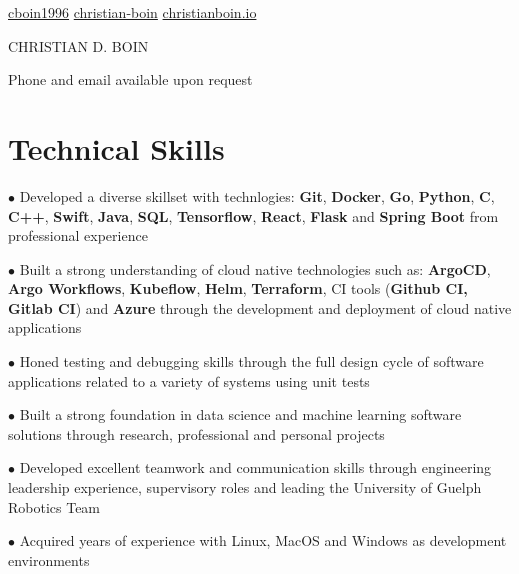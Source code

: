 \documentclass[a4paper,11pt]{article}
\newcommand{\name}{CHRISTIAN D. BOIN} %
\newcommand{\github}{cboin1996} %
\newcommand{\linkedin}{christian-boin-6b705a135} %
\begin{document}
\selectfont


\newcommand{\iconspace}{0.4mm}
\newcommand{\headingsep}{1cm}
\begin{center}
    \small{\href{https://github.com/\github}{\faGithub \hspace{\iconspace} \github} \hspace{\headingsep}
           \href{https://www.linkedin.com/in/\linkedin/}{\faLinkedinSquare \hspace{\iconspace} christian-boin} \hspace{\headingsep}
           \href{http://www.christianboin.io}{\faFileCodeO \hspace{\iconspace} christianboin.io}
    }
\end{center}
\begin{center}
    \vspace{-0.4cm}
    \huge{{\name}}
\end{center}
\begin{center}
    \vspace{-0.2cm}
    \tiny{
        Phone and email available upon request
    }
\end{center}
\section{Technical Skills}
\resumeItemListStart
\item[$\bullet$] Developed a diverse skillset with technlogies: \textbf{Git}, \textbf{Docker}, \textbf{Go},
\textbf{Python}, \textbf{C}, \textbf{C++}, \textbf{Swift}, \textbf{Java}, \textbf{SQL}, \textbf{Tensorflow}, \textbf{React},
\textbf{Flask} and \textbf{Spring Boot} from professional experience
\item[$\bullet$] Built a strong understanding of cloud native technologies such as: \textbf{ArgoCD}, \textbf{Argo Workflows},
\textbf{Kubeflow}, \textbf{Helm},
\textbf{Terraform}, CI tools (\textbf{Github CI, Gitlab CI}) and \textbf{Azure} through the development and deployment
of cloud native applications
\item[$\bullet$] Honed testing and debugging skills through the full design cycle of software applications related
to a variety of systems using unit tests
\item[$\bullet$] Built a strong foundation in data science and machine learning software solutions through
research, professional and personal projects
\item[$\bullet$] Developed excellent teamwork and communication skills through engineering leadership experience,
supervisory roles and leading the University of Guelph Robotics Team
\item[$\bullet$] Acquired years of experience with Linux, MacOS and Windows as development environments
\resumeItemListEnd
\end{document}
